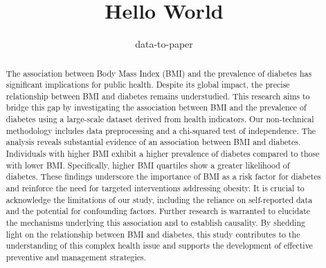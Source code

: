 \documentclass[12pt]{article}
\title{Hello World}
\author{data-to-paper}
\begin{document}
\maketitle

\begin{abstract}
The association between Body Mass Index (BMI) and the prevalence of diabetes has significant implications for public health. Despite its global impact, the precise relationship between BMI and diabetes remains understudied. This research aims to bridge this gap by investigating the association between BMI and the prevalence of diabetes using a large-scale dataset derived from health indicators. Our non-technical methodology includes data preprocessing and a chi-squared test of independence. The analysis reveals substantial evidence of an association between BMI and diabetes. Individuals with higher BMI exhibit a higher prevalence of diabetes compared to those with lower BMI. Specifically, higher BMI quartiles show a greater likelihood of diabetes. These findings underscore the importance of BMI as a risk factor for diabetes and reinforce the need for targeted interventions addressing obesity. It is crucial to acknowledge the limitations of our study, including the reliance on self-reported data and the potential for confounding factors. Further research is warranted to elucidate the mechanisms underlying this association and to establish causality. By shedding light on the relationship between BMI and diabetes, this study contributes to the understanding of this complex health issue and supports the development of effective preventive and management strategies.
\end{abstract}
\end{document}
